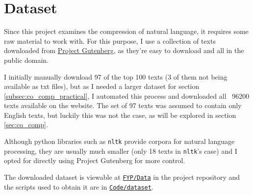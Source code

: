 \section{Dataset}

Since this project examines the compression of natural language, it requires some raw material to work with. For this purpose, I use a collection of texts downloaded from \href{https://gutenberg.org/browse/scores/top}{Project Gutenberg}, as they're easy to download and all in the public domain.

I initially manually download 97 of the top 100 texts (3 of them not being available as txt files), but as I needed a larger dataset for section \ref{subsec:co_comp_practical}, I automated this process and downloaded all ~96200 texts available on the website. The set of 97 texts was assumed to contain only English texts, but luckily this was not the case, as will be explored in section \ref{sec:co_comp}.

Although python libraries such as \texttt{nltk} provide corpora for natural language processing, they are usually much smaller (only 18 texts in \texttt{nltk}'s case) and I opted for directly using Project Gutenberg for more control.

The downloaded dataset is viewable at \texttt{\href{https://github.com/Guy29/FYP/blob/main/Data}{FYP/Data}} in the project repository and the scripts used to obtain it are in \texttt{\href{https://github.com/Guy29/FYP/blob/main/Code/dataset/}{Code/dataset}}.